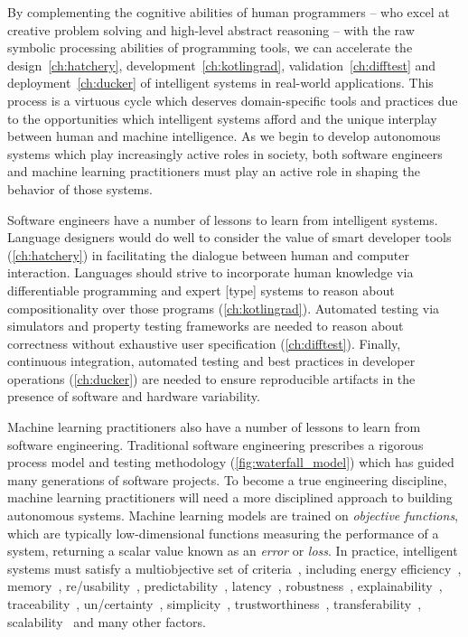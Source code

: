 By complementing the cognitive abilities of human programmers -- who excel at creative problem solving and high-level abstract reasoning -- with the raw symbolic processing abilities of programming tools, we can accelerate the design~\autoref{ch:hatchery}, development~\autoref{ch:kotlingrad}, validation~\autoref{ch:difftest} and deployment~\autoref{ch:ducker} of intelligent systems in real-world applications. This process is a virtuous cycle which deserves domain-specific tools and practices due to the opportunities which intelligent systems afford and the unique interplay between human and machine intelligence. As we begin to develop autonomous systems which play increasingly active roles in society, both software engineers and machine learning practitioners must play an active role in shaping the behavior of those systems.

Software engineers have a number of lessons to learn from intelligent systems. Language designers would do well to consider the value of smart developer tools (\autoref{ch:hatchery}) in facilitating the dialogue between human and computer interaction. Languages should strive to incorporate human knowledge via differentiable programming and expert [type] systems to reason about compositionality over those programs (\autoref{ch:kotlingrad}). Automated testing via simulators and property testing frameworks are needed to reason about correctness without exhaustive user specification (\autoref{ch:difftest}). Finally, continuous integration, automated testing and best practices in developer operations (\autoref{ch:ducker}) are needed to ensure reproducible artifacts in the presence of software and hardware variability.

Machine learning practitioners also have a number of lessons to learn from software engineering. Traditional software engineering prescribes a rigorous process model and testing methodology (\autoref{fig:waterfall_model}) which has guided many generations of software projects. To become a true engineering discipline, machine learning practitioners will need a more disciplined approach to building autonomous systems. Machine learning models are trained on \textit{objective functions}, which are typically low-dimensional functions measuring the performance of a system, returning a scalar value known as an \textit{error} or \textit{loss}. In practice, intelligent systems must satisfy a multiobjective set of criteria~\citep{censi2015mathematical}, including energy efficiency~\citep{paull2010novel}, memory~\citep{memory2013mitliagkas}, re/usability~\citep{breuleux2017automatic,deleu2019torchmeta}, predictability~\citep{turner2017well}, latency~\citep{ravanelli2018twin}, robustness~\citep{pineau2003policy}, explainability~\citep{turner2016model}, traceability~\citep{guo2017semantically, tsirigotis2018orion}, un/certainty~\citep{diaz2018interactive}, simplicity~\citep{kastner2019representation}, trustworthiness~\citep{xu2017efficient}, transferability~\citep{mehta2019active}, scalability~\citep{luan2019break} and many other factors.

